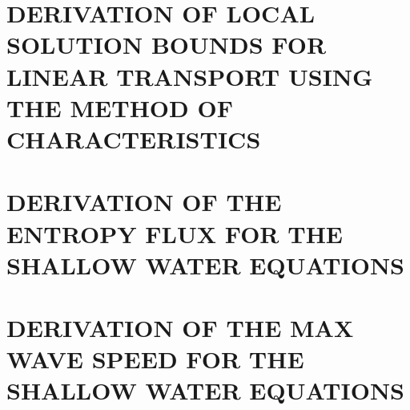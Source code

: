 \begin{appendices}
\renewcommand{\appendixname}{APPENDIX}

\chapter{DERIVATION OF LOCAL SOLUTION BOUNDS FOR LINEAR TRANSPORT USING
  THE METHOD OF CHARACTERISTICS
  \label{sec:analytic_dmp}}
  
\chapter{DERIVATION OF THE ENTROPY FLUX FOR THE SHALLOW WATER EQUATIONS
\label{sec:shallow_water_entropy_flux}}
  
%    
%    
\chapter{DERIVATION OF THE MAX WAVE SPEED FOR THE SHALLOW WATER EQUATIONS
\label{app:shallow_water_max_wave_speed}}
  

\end{appendices}
